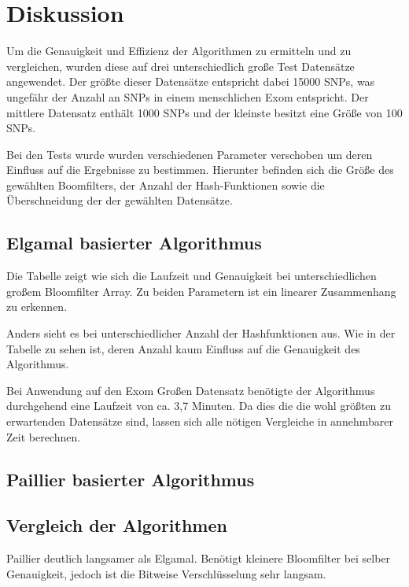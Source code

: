 \chapter{Diskussion}

Um die Genauigkeit und Effizienz der Algorithmen zu ermitteln und zu vergleichen, wurden diese auf drei unterschiedlich große Test Datensätze angewendet. 
Der größte dieser Datensätze entspricht dabei 15000 SNPs, was ungefähr der Anzahl an SNPs in einem menschlichen Exom entspricht.
Der mittlere Datensatz enthält 1000 SNPs und der kleinste besitzt eine Größe von 100 SNPs. 

Bei den Tests wurde wurden verschiedenen Parameter verschoben um deren Einfluss auf die Ergebnisse zu bestimmen.
Hierunter befinden sich die Größe des gewählten Boomfilters, der Anzahl der Hash-Funktionen sowie die Überschneidung der der gewählten Datensätze.

\section{Elgamal basierter Algorithmus}

Die Tabelle zeigt wie sich die Laufzeit und Genauigkeit bei unterschiedlichen großem Bloomfilter Array. 
Zu beiden Parametern ist ein linearer Zusammenhang zu erkennen.

Anders sieht es bei unterschiedlicher Anzahl der Hashfunktionen aus. 
Wie in der Tabelle zu sehen ist, deren Anzahl kaum Einfluss auf die Genauigkeit des Algorithmus.

Bei Anwendung auf den Exom Großen Datensatz benötigte der Algorithmus durchgehend eine Laufzeit von ca. 3,7 Minuten.
Da dies die die wohl größten zu erwartenden Datensätze sind, lassen sich alle nötigen Vergleiche in annehmbarer Zeit berechnen. 


\section{Paillier basierter Algorithmus}


\section{Vergleich der Algorithmen}

Paillier deutlich langsamer als Elgamal. Benötigt kleinere Bloomfilter bei selber Genauigkeit, jedoch ist die Bitweise Verschlüsselung sehr langsam.
